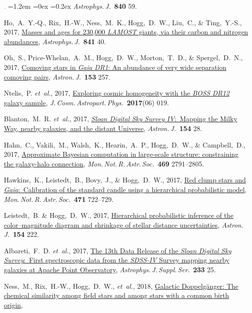 \documentclass[10pt,letterpaper]{article}
\newcommand{\acronym}[1]{{\small{#1}}}
\newcommand{\foreign}[1]{\textsl{#1}}
\newcommand{\etal}{\foreign{et~al.}}
\newcommand{\project}[1]{\textsl{#1}}
\newcommand{\doi}[2]{\href{http://dx.doi.org/#1}{{#2}}}
\newcommand{\deemph}[1]{\textcolor{grey}{\footnotesize{#1}}}
\newcommand{\pubnumber}[1]{\deemph{{#1}.}}
\newcounter{refpubnum}
\newcommand{\hogglist}{%
    \rightmargin=0in
    \leftmargin=1.2em
    \topsep=0ex
    \partopsep=0pt
    \itemsep=0.2ex
    \parsep=0pt
    \itemindent=-1.0\leftmargin
    \listparindent=0.0\leftmargin
    \settowidth{\labelsep}{~}
    \usecounter{refpubnum}
  }
\begin{document}
\begin{list}{\pubnumber{\therefpubnum}}{\hogglist}
\textit{Astrophys.\,J.}\ \textbf{840} 59.
\item
Ho,~A.~Y.-Q., Rix,~H.-W., Ness,~M.~K., Hogg,~D.~W., Liu,~C., \& Ting,~Y.-S., 2017,
\doi{10.3847/1538-4357/aa6db3}{Masses and ages for 230,000 \project{\acronym{LAMOST}} giants, via their carbon and nitrogen abundances},
\textit{Astrophys.\,J.}\ \textbf{841} 40.
\item
Oh,~S., Price-Whelan,~A.~M., Hogg,~D.~W., Morton,~T.~D., \& Spergel,~D.~N., 2017,
\doi{10.3847/1538-3881/aa6ffd}{Comoving stars in \project{Gaia \acronym{DR1}}: An abundance of very wide separation comoving pairs},
\textit{Astron.\,J.}\ \textbf{153} 257.
\item
Ntelis,~P. \etal, 2017,
\doi{10.1088/1475-7516/2017/06/019}{Exploring cosmic homogeneity with the \project{\acronym{BOSS DR12}} galaxy sample},
\textit{J.\,Cosm.\,Astropart.\,Phys.}\ \textbf{2017}(06) 019.
\item
Blanton,~M.~R. \etal, 2017,
\doi{10.3847/1538-3881/aa7567}{\project{Sloan Digital Sky Survey \acronym{IV}}:\ Mapping the Milky Way, nearby galaxies, and the distant Universe},
\textit{Astron.\,J.}\ \textbf{154} 28.
\item
Hahn,~C., Vakili,~M., Walsh,~K., Hearin,~A.~P., Hogg,~D.~W., \& Campbell,~D., 2017,
\doi{10.1093/mnras/stx894}{Approximate Bayesian computation in large-scale structure: constraining the galaxy-halo connection},
\textit{Mon.\,Not.\,R.\,Astr.\,Soc.}\ \textbf{469} 2791--2805.
\item
Hawkins,~K., Leistedt,~B., Bovy,~J., \& Hogg,~D.~W., 2017,
\doi{10.1093/mnras/stx1655}{Red clump stars and \project{Gaia}:\ Calibration of the standard candle using a hierarchical probabilistic model},
\textit{Mon.\,Not.\,R.\,Astr.\,Soc.}\ \textbf{471} 722--729.
\item
Leistedt,~B. \& Hogg,~D.~W., 2017,
\doi{10.3847/1538-3881/aa91d5}{Hierarchical probabilistic inference of the color--magnitude diagram and shrinkage of stellar distance uncertainties},
\textit{Astron.\,J.}\ \textbf{154} 222.
\item
Albareti,~F.~D. \etal, 2017,
\doi{10.3847/1538-4365/aa8992}{The 13th Data Release of the \project{Sloan Digital Sky Survey}:\ First spectroscopic data from the \project{\acronym{SDSS-IV}} Survey mapping nearby galaxies at Apache Point Observatory},
\textit{Astrophys.\,J.\,Suppl.\,Ser.}\ \textbf{233} 25.
\item
Ness,~M., Rix,~H.-W., Hogg,~D.~W., \etal, 2018,
\doi{10.3847/1538-4357/aa9d8e}{Galactic Doppelg\"anger: The chemical similarity among field stars and among stars with a common birth origin},

\end{list}
\end{document}
